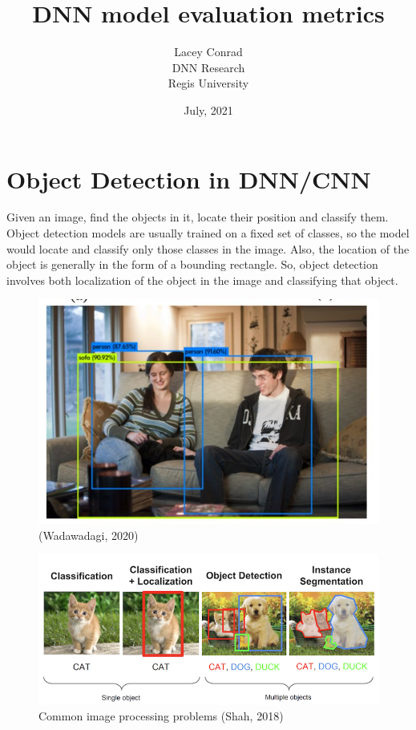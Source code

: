 \documentclass[]{article}
\title{DNN model evaluation metrics}
\author{Lacey Conrad\\DNN Research\\ Regis University}
\date{July, 2021}
\begin{document}
	\maketitle


\section{Object Detection in DNN/CNN} 
Given an image, find the objects in it, locate their position and classify them.
Object detection models are usually trained on a fixed set of classes, so the model would locate and classify only those classes in the image.
Also, the location of the object is generally in the form of a bounding rectangle.
So, object detection involves both localization of the object in the image and classifying that object.
\begin{figure}[!h]
	\includegraphics[scale=0.95]{bounding_boxes}
	\caption{(Wadawadagi, 2020)}
	\label{Fig:Race}
\end{figure}

\begin{figure}[!h]
	\includegraphics[scale=0.65]{obj_det}
	\caption{Common image processing problems (Shah, 2018)}
	\label{Fig:Race}
\end{figure}
\end{document}
